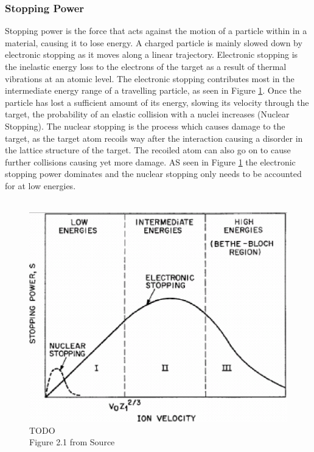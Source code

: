 \documentclass[12pt,a4paper]{article}
\begin{document}
\subsubsection{Stopping Power}
\label{stop}
Stopping power is the force that acts against the motion of a particle within in a material, causing it to lose energy. A charged particle is mainly slowed down by electronic stopping as it moves along a linear trajectory. Electronic stopping is the inelastic energy loss to the electrons of the target as a result of thermal vibrations at an atomic level. The electronic stopping contributes most in the intermediate energy range of a travelling particle, as seen in Figure \ref{stprg}. Once the particle has lost a sufficient amount of its energy, slowing its velocity through the target, the probability of an elastic collision with a nuclei increases (Nuclear Stopping). The nuclear stopping is the process which causes damage to the target, as the target atom recoils way after the interaction causing a disorder in the lattice structure of the target. The recoiled atom can also go on to cause further collisions causing yet more damage. AS seen in Figure \ref{stprg} the electronic stopping power dominates and the nuclear stopping only needs to be accounted for at low energies.
\\\\
\begin{figure}[h!]
\centering
\includegraphics[scale=0.4]{Images//Stopping//stoppingrange.png}
\caption[width=\columnwidth]{TODO\\Figure 2.1 from Source \cite{stprg}}
\label{stprg}
\end{figure}
\end{document}
